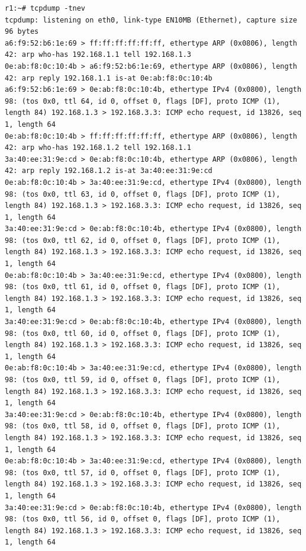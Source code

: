 \documentclass[a4paper,12pt]{article}
\begin{document}
\begin{Verbatim}
r1:~# tcpdump -tnev
tcpdump: listening on eth0, link-type EN10MB (Ethernet), capture size 96 bytes
a6:f9:52:b6:1e:69 > ff:ff:ff:ff:ff:ff, ethertype ARP (0x0806), length 42: arp who-has 192.168.1.1 tell 192.168.1.3
0e:ab:f8:0c:10:4b > a6:f9:52:b6:1e:69, ethertype ARP (0x0806), length 42: arp reply 192.168.1.1 is-at 0e:ab:f8:0c:10:4b
a6:f9:52:b6:1e:69 > 0e:ab:f8:0c:10:4b, ethertype IPv4 (0x0800), length 98: (tos 0x0, ttl 64, id 0, offset 0, flags [DF], proto ICMP (1), length 84) 192.168.1.3 > 192.168.3.3: ICMP echo request, id 13826, seq 1, length 64
0e:ab:f8:0c:10:4b > ff:ff:ff:ff:ff:ff, ethertype ARP (0x0806), length 42: arp who-has 192.168.1.2 tell 192.168.1.1
3a:40:ee:31:9e:cd > 0e:ab:f8:0c:10:4b, ethertype ARP (0x0806), length 42: arp reply 192.168.1.2 is-at 3a:40:ee:31:9e:cd
0e:ab:f8:0c:10:4b > 3a:40:ee:31:9e:cd, ethertype IPv4 (0x0800), length 98: (tos 0x0, ttl 63, id 0, offset 0, flags [DF], proto ICMP (1), length 84) 192.168.1.3 > 192.168.3.3: ICMP echo request, id 13826, seq 1, length 64
3a:40:ee:31:9e:cd > 0e:ab:f8:0c:10:4b, ethertype IPv4 (0x0800), length 98: (tos 0x0, ttl 62, id 0, offset 0, flags [DF], proto ICMP (1), length 84) 192.168.1.3 > 192.168.3.3: ICMP echo request, id 13826, seq 1, length 64
0e:ab:f8:0c:10:4b > 3a:40:ee:31:9e:cd, ethertype IPv4 (0x0800), length 98: (tos 0x0, ttl 61, id 0, offset 0, flags [DF], proto ICMP (1), length 84) 192.168.1.3 > 192.168.3.3: ICMP echo request, id 13826, seq 1, length 64
3a:40:ee:31:9e:cd > 0e:ab:f8:0c:10:4b, ethertype IPv4 (0x0800), length 98: (tos 0x0, ttl 60, id 0, offset 0, flags [DF], proto ICMP (1), length 84) 192.168.1.3 > 192.168.3.3: ICMP echo request, id 13826, seq 1, length 64
0e:ab:f8:0c:10:4b > 3a:40:ee:31:9e:cd, ethertype IPv4 (0x0800), length 98: (tos 0x0, ttl 59, id 0, offset 0, flags [DF], proto ICMP (1), length 84) 192.168.1.3 > 192.168.3.3: ICMP echo request, id 13826, seq 1, length 64
3a:40:ee:31:9e:cd > 0e:ab:f8:0c:10:4b, ethertype IPv4 (0x0800), length 98: (tos 0x0, ttl 58, id 0, offset 0, flags [DF], proto ICMP (1), length 84) 192.168.1.3 > 192.168.3.3: ICMP echo request, id 13826, seq 1, length 64
0e:ab:f8:0c:10:4b > 3a:40:ee:31:9e:cd, ethertype IPv4 (0x0800), length 98: (tos 0x0, ttl 57, id 0, offset 0, flags [DF], proto ICMP (1), length 84) 192.168.1.3 > 192.168.3.3: ICMP echo request, id 13826, seq 1, length 64
3a:40:ee:31:9e:cd > 0e:ab:f8:0c:10:4b, ethertype IPv4 (0x0800), length 98: (tos 0x0, ttl 56, id 0, offset 0, flags [DF], proto ICMP (1), length 84) 192.168.1.3 > 192.168.3.3: ICMP echo request, id 13826, seq 1, length 64

\end{Verbatim}
\end{document}
